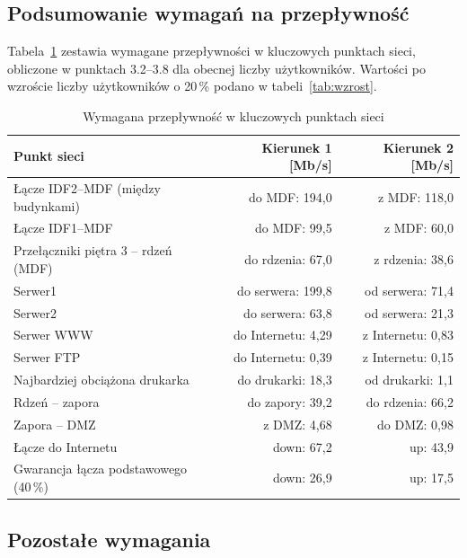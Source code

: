 \documentclass[12pt,a4paper]{article}
\begin{document}
\subsection{Podsumowanie wymagań na przepływność}

Tabela~\ref{tab:podsumowanie} zestawia wymagane przepływności w kluczowych
punktach sieci, obliczone w punktach 3.2--3.8 dla obecnej liczby
użytkowników. Wartości po wzroście liczby użytkowników o 20\,\% podano
w tabeli~\ref{tab:wzrost}.

\begin{table}[H]
\centering
\caption{Wymagana przepływność w kluczowych punktach sieci}
\label{tab:podsumowanie}
\begin{tabular}{lrr}
\toprule
Punkt sieci & Kierunek 1 [Mb/s] & Kierunek 2 [Mb/s] \\
\midrule
Łącze IDF2--MDF (między budynkami) & do MDF: 194{,}0 & z MDF: 118{,}0 \\
Łącze IDF1--MDF                    & do MDF: 99{,}5  & z MDF: 60{,}0 \\
Przełączniki piętra 3 -- rdzeń (MDF) & do rdzenia: 67{,}0 & z rdzenia: 38{,}6 \\
Serwer1                            & do serwera: 199{,}8 & od serwera: 71{,}4 \\
Serwer2                            & do serwera: 63{,}8  & od serwera: 21{,}3 \\
Serwer WWW                         & do Internetu: 4{,}29 & z Internetu: 0{,}83 \\
Serwer FTP                         & do Internetu: 0{,}39 & z Internetu: 0{,}15 \\
Najbardziej obciążona drukarka     & do drukarki: 18{,}3 & od drukarki: 1{,}1 \\
Rdzeń -- zapora                    & do zapory: 39{,}2 & do rdzenia: 66{,}2 \\
Zapora -- DMZ                      & z DMZ: 4{,}68 & do DMZ: 0{,}98 \\
Łącze do Internetu                 & down: 67{,}2 & up: 43{,}9 \\
Gwarancja łącza podstawowego (40\,\%) & down: 26{,}9 & up: 17{,}5 \\
\bottomrule
\end{tabular}
\end{table}

\subsection{Pozostałe wymagania}
\end{document}
